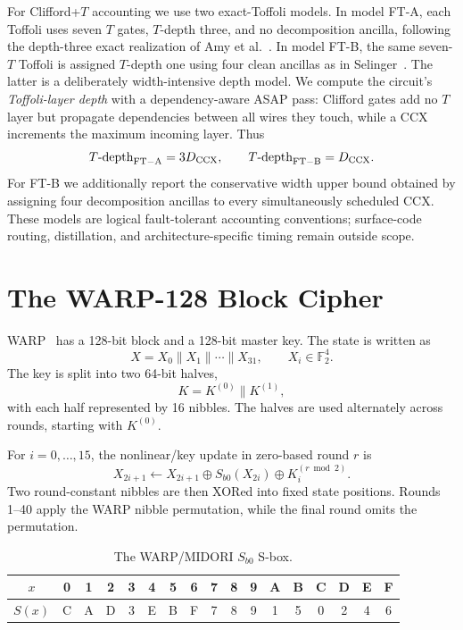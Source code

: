\documentclass[pdflatex,sn-nature]{sn-jnl}
\newcommand{\F}{\mathbb{F}}
\newcommand{\Sb}{S_{b0}}
\theoremstyle{thmstyleone}
\theoremstyle{thmstyletwo}
\begin{document}
For Clifford+$T$ accounting we use two exact-Toffoli models. In model FT-A, each Toffoli uses seven $T$ gates, $T$-depth three, and no decomposition ancilla, following the depth-three exact realization of Amy et al.~\cite{Amy2013}. In model FT-B, the same seven-$T$ Toffoli is assigned $T$-depth one using four clean ancillas as in Selinger~\cite{Selinger2013}. The latter is a deliberately width-intensive depth model. We compute the circuit's \emph{Toffoli-layer depth} with a dependency-aware ASAP pass: Clifford gates add no $T$ layer but propagate dependencies between all wires they touch, while a CCX increments the maximum incoming layer. Thus
\begin{equation}
T\text{-depth}_{\rm FT-A}=3D_{\rm CCX},\qquad
T\text{-depth}_{\rm FT-B}=D_{\rm CCX}.
\end{equation}
For FT-B we additionally report the conservative width upper bound obtained by assigning four decomposition ancillas to every simultaneously scheduled CCX. These models are logical fault-tolerant accounting conventions; surface-code routing, distillation, and architecture-specific timing remain outside scope.

\section{The WARP-128 Block Cipher}

WARP~\cite{WARP2020} has a 128-bit block and a 128-bit master key. The state is written as
\begin{equation}
    X = X_0\|X_1\|\cdots\|X_{31}, \qquad X_i\in\F_2^4.
\end{equation}
The key is split into two 64-bit halves,
\begin{equation}
    K = K^{(0)}\|K^{(1)},
\end{equation}
with each half represented by 16 nibbles. The halves are used alternately across rounds, starting with $K^{(0)}$.

For $i=0,\ldots,15$, the nonlinear/key update in zero-based round $r$ is
\begin{equation}
    X_{2i+1}\leftarrow X_{2i+1}\oplus \Sb(X_{2i})\oplus K^{(r\bmod 2)}_i.
    \label{eq:warp_subround}
\end{equation}
Two round-constant nibbles are then XORed into fixed state positions. Rounds 1--40 apply the WARP nibble permutation, while the final round omits the permutation.

\begin{table}[t]
\centering
\caption{The WARP/MIDORI $S_{b0}$ S-box.}
\label{tab:sbox}
\begin{tabular}{c|*{16}{c}}
\toprule
$x$ & 0 & 1 & 2 & 3 & 4 & 5 & 6 & 7 & 8 & 9 & A & B & C & D & E & F\\
\midrule
$S(x)$ & C & A & D & 3 & E & B & F & 7 & 8 & 9 & 1 & 5 & 0 & 2 & 4 & 6\\
\bottomrule
\end{tabular}
\end{table}
\end{document}
